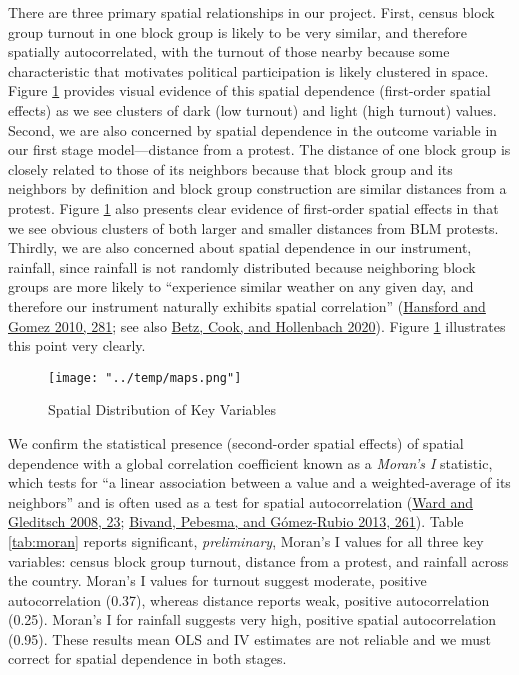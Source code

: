 \documentclass[
  12pt,
]{article}
\begin{document}
There are three primary spatial relationships in our project. First, census block group turnout in one block group is likely to be very similar, and therefore spatially autocorrelated, with the turnout of those nearby because some characteristic that motivates political participation is likely clustered in space. Figure \ref{fig:maps} provides visual evidence of this spatial dependence (first-order spatial effects) as we see clusters of dark (low turnout) and light (high turnout) values. Second, we are also concerned by spatial dependence in the outcome variable in our first stage model---distance from a protest. The distance of one block group is closely related to those of its neighbors because that block group and its neighbors by definition and block group construction are similar distances from a protest. Figure \ref{fig:maps} also presents clear evidence of first-order spatial effects in that we see obvious clusters of both larger and smaller distances from BLM protests. Thirdly, we are also concerned about spatial dependence in our instrument, rainfall, since rainfall is not randomly distributed because neighboring block groups are more likely to ``experience similar weather on any given day, and therefore our instrument naturally exhibits spatial correlation'' (\protect\hyperlink{ref-Hansford2010}{Hansford and Gomez 2010, 281}; see also \protect\hyperlink{ref-Betz2020}{Betz, Cook, and Hollenbach 2020}). Figure \ref{fig:maps} illustrates this point very clearly.

\begin{figure}
\hypertarget{fig:maps}{%
\centering
\texttt{[image: "../temp/maps.png"]}
\caption{Spatial Distribution of Key Variables}\label{fig:maps}
}
\end{figure}

We confirm the statistical presence (second-order spatial effects) of spatial dependence with a global correlation coefficient known as a \emph{Moran's I} statistic, which tests for ``a linear association between a value and a weighted-average of its neighbors'' and is often used as a test for spatial autocorrelation (\protect\hyperlink{ref-Ward2008}{Ward and Gleditsch 2008, 23}; \protect\hyperlink{ref-Bivand2013}{Bivand, Pebesma, and Gómez-Rubio 2013, 261}). Table \ref{tab:moran} reports significant, \emph{preliminary}, Moran's I values for all three key variables: census block group turnout, distance from a protest, and rainfall across the country. Moran's I values for turnout suggest moderate, positive autocorrelation (0.37), whereas distance reports weak, positive autocorrelation (0.25). Moran's I for rainfall suggests very high, positive spatial autocorrelation (0.95). These results mean OLS and IV estimates are not reliable and we must correct for spatial dependence in both stages.
\end{document}

